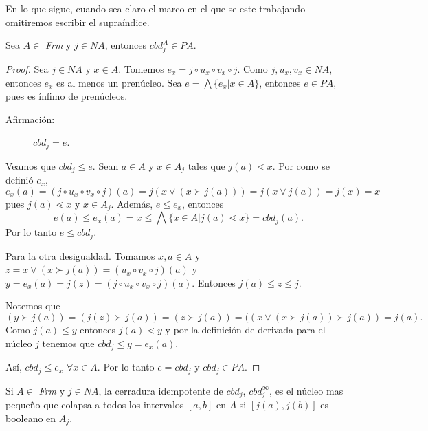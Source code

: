 En lo que sigue, cuando sea claro el marco en el que se este trabajando omitiremos escribir el supraíndice.

\begin{theorem}
Sea $A\in$ \textit{Frm} y $j\in NA$, entonces $cbd_j^{A}\in PA$.
\end{theorem}

\begin{proof}
Sea $j\in NA$ y $x\in A$. Tomemos $e_x=j\circ u_x\circ v_x\circ j$. Como $j, u_x, v_x\in NA$, entonces $e_x$ es al menos un prenúcleo. Sea $e=\bigwedge\{e_x|x\in A\}$, entonces $e\in PA$, pues es ínfimo de prenúcleos.
\begin{description}
\item[Afirmación:] $cbd_j=e$. 
\end{description}

Veamos que $cbd_j\leq e$. Sean $a\in A$ y $x\in A_j$ tales que $j(a)\lessdot x$. Por como se definió $e_x$, $e_x(a)=(j\circ u_x\circ v_x\circ j)(a)=j(x\vee (x\succ j(a)))=j(x\vee j(a))=j(x)=x$ pues $j(a)\lessdot x$ y $x\in A_j$. Además, $e\leq e_x$, entonces 
$$e(a)\leq e_x(a)=x\leq \bigwedge\{x\in A|j(a)\lessdot x\}=cbd_j(a).$$
Por lo tanto $e\leq cbd_j$.

Para la otra desigualdad. Tomamos $x,a\in A$ y $z=x\vee (x\succ j(a))=(u_x \circ v_x\circ j)(a)$ y $y=e_x(a)=j(z)=(j\circ u_x \circ v_x\circ j)(a)$. Entonces $j(a)\leq z\leq j$.

\noindent
Notemos que $$(y\succ j(a))=(j(z)\succ j(a))=(z\succ j(a))=((x\vee (x\succ j(a))\succ j(a))=j(a).$$ 
Como $j(a)\leq y$ entonces $j(a)\lessdot y$ y por la definición de derivada para el núcleo $j$ tenemos que $cbd_j\leq y=e_x(a)$.

\noindent
Así, $cbd_j\leq e_x$ $\forall x\in A$. Por lo tanto $e=cbd_j$ y $cbd_j\in PA$. 
\end{proof}

\begin{lemma}
Si $A\in$ \textit{Frm} y $j\in NA$, la cerradura idempotente de $cbd_j$, $cbd_j^{\infty}$, es el núcleo mas pequeño que colapsa a todos los intervalos $[a, b]$ en $A$ si $[j(a),j(b)]$ es booleano en $A_j$.
\end{lemma}

